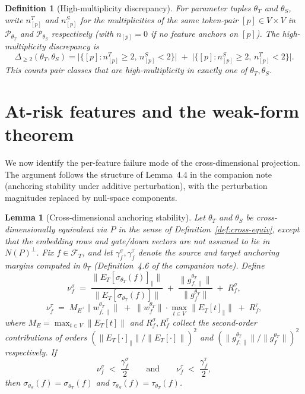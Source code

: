 \documentclass{article}
\newtheorem{lemma}[theorem]{Lemma}
\newtheorem{definition}[theorem]{Definition}
\begin{document}
\begin{definition}[High-multiplicity discrepancy]
	\label{def:discrepancy}
	For parameter tuples $\theta_T$ and $\theta_S$, write $n_{[p]}^T$ and $n_{[p]}^S$ for the multiplicities of the same token-pair $[p] \in V \times V$ in $\mathcal{P}_{\theta_T}$ and $\mathcal{P}_{\theta_S}$ respectively (with $n_{[p]} = 0$ if no feature anchors on $[p]$). The \emph{high-multiplicity discrepancy} is
	\[
		\Delta_{\geq 2}(\theta_T, \theta_S) = \big| \{ [p] : n_{[p]}^T \geq 2, \, n_{[p]}^S < 2 \} \big| \;+\; \big| \{ [p] : n_{[p]}^S \geq 2, \, n_{[p]}^T < 2 \} \big|.
	\]
	This counts pair classes that are high-multiplicity in exactly one of $\theta_T, \theta_S$.
\end{definition}

\section{At-risk features and the weak-form theorem}
\label{sec:atrisk}

We now identify the per-feature failure mode of the cross-dimensional projection. The argument follows the structure of Lemma~4.4 in the companion note (anchoring stability under additive perturbation), with the perturbation magnitudes replaced by null-space components.

\begin{lemma}[Cross-dimensional anchoring stability]
	\label{lem:cross-anchoring}
	Let $\theta_T$ and $\theta_S$ be cross-dimensionally equivalent via $P$ in the sense of Definition~\ref{def:cross-equiv}, except that the embedding rows and gate/down vectors are not assumed to lie in $N(P)^\perp$. Fix $f \in \mathcal{F}_T$, and let $\gamma_f^\sigma, \gamma_f^\tau$ denote the source and target anchoring margins computed in $\theta_T$ (Definition~4.6 of the companion note). Define
	\[
		\nu_f^\sigma \;=\; \frac{\|E_T[\sigma_{\theta_T}(f)]_\parallel\|}{\|E_T[\sigma_{\theta_T}(f)]\|} \;+\; \frac{\|g_{f,\parallel}^{\theta_T}\|}{\|g_f^{\theta_T}\|} \;+\; R_f^\sigma,
	\]
	\[
		\nu_f^\tau \;=\; M_E \cdot \|w_{f,\parallel}^{\theta_T}\| \;+\; \|w_f^{\theta_T}\| \cdot \max_{t \in V} \|E_T[t]_\parallel\| \;+\; R_f^\tau,
	\]
	where $M_E = \max_{t \in V} \|E_T[t]\|$ and $R_f^\sigma, R_f^\tau$ collect the second-order contributions of orders $(\|E_T[\cdot]_\parallel\|/\|E_T[\cdot]\|)^2$ and $(\|g_{f,\parallel}^{\theta_T}\|/\|g_f^{\theta_T}\|)^2$ respectively. If
	\[
		\nu_f^\sigma \;<\; \frac{\gamma_f^\sigma}{2} \qquad \text{and} \qquad \nu_f^\tau \;<\; \frac{\gamma_f^\tau}{2},
	\]
	then $\sigma_{\theta_S}(f) = \sigma_{\theta_T}(f)$ and $\tau_{\theta_S}(f) = \tau_{\theta_T}(f)$.
\end{lemma}
\end{document}
